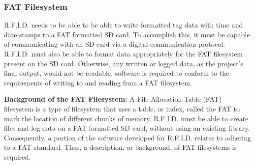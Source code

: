 \label{sss:FAT}
\subsubsection{FAT Filesystem} %

R.F.I.D. needs to be able to be able to write formatted tag data with time and date stamps to a FAT formatted SD card. To accomplish this, it must be capable of communicating with an SD card via a digital communication protocol. R.F.I.D. must also be able to format data appropriately for the FAT filesystem present on the SD card. Otherwise, any written or logged data, as the project's final output, would not be readable. \DIFdelbegin {}\DIFdelend \DIFaddbegin {}\DIFaddend software is required to conform to the requirements of writing to and reading from a FAT filesystem. 
\DIFdelbegin {}\DIFdelend %




\label{ssss:FAT_background}
\textbf{Background of the FAT Filesystem:} A File Allocation Table (FAT) filesystem is a type of filesystem that uses a table, or index, called the FAT to mark the location of different chunks of memory. R.F.I.D. must be able to create files and log data on a FAT formatted SD card, without using an existing library. Consequently, a \DIFdelbegin {}\DIFdelend \DIFaddbegin {}\DIFaddend portion of the software developed for R.F.I.D. relates to adhering to a FAT standard. Thus, a description, or background, of FAT filesystems is required.

